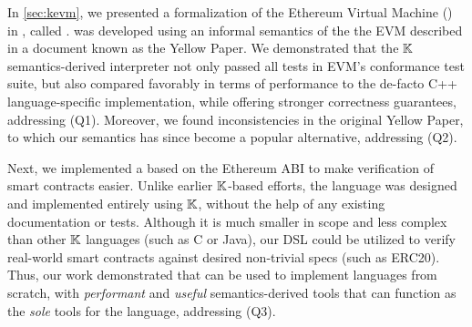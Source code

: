 In \autoref{sec:kevm}, we presented a formalization of the
Ethereum Virtual Machine (\EVM{}) in \K{}, called \KEVM{}.
\KEVM{} was developed using an informal semantics of the
the EVM described in a document known as the Yellow Paper.
We demonstrated that the $\mathbb{K}{}$ semantics-derived
interpreter not only passed all tests in EVM's conformance test suite,
but also compared favorably in terms of performance to the de-facto
C++ language-specific implementation, while offering stronger correctness
guarantees, addressing (Q1). Moreover, we found inconsistencies
in the original Yellow Paper, to which our semantics has since become a popular
alternative, addressing (Q2).

Next, we implemented a \DSL{} based on the Ethereum ABI to make verification of
smart contracts easier. Unlike earlier $\mathbb{K}$-based efforts, the language was
designed and implemented entirely using $\mathbb{K}$, without the help of any
existing documentation or tests. Although it is much smaller in scope and
less complex than other $\mathbb{K}$ languages (such as C or Java), our DSL could be
utilized to verify real-world smart contracts against desired non-trivial specs
(such as ERC20). Thus, our work demonstrated that \K{} can be used to implement
languages from scratch, with \emph{performant} and \emph{useful}
semantics-derived tools that can function as the \emph{sole} tools for the
language, addressing (Q3).






